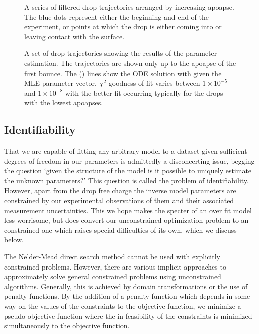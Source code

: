 \documentclass[12pt,a4paper,oneside]{book}
\begin{document}
\begin{figure}[h]
    \centering
    \resizebox{\textwidth}{!}{}
    \caption{A series of filtered drop trajectories arranged by increasing apoapse. The blue dots represent either the beginning and end of the experiment, or points at which the drop is either coming into or leaving contact with the surface.}
    \label{fig:trajectories}
\end{figure}
\begin{figure}[h]
    \centering
    \resizebox{\textwidth}{!}{}
    \caption{A set of drop trajectories showing the results of the parameter estimation. The trajectories are shown only up to the apoapse of the first bounce. The (\protect\redline) \hspace{0.25 mm} lines show the ODE solution with given the MLE parameter vector. $\chi^2$ goodness-of-fit varies between $1 \times 10^{-5}$ and $1 \times 10^{-8}$ with the better fit occurring typically for the drops with the lowest apoapses.}
    \label{fig:inverse_problem}
\end{figure}

\subsection{Identifiability}
That we are capable of fitting any arbitrary model to a dataset given sufficient degrees of freedom in our parameters is admittedly a disconcerting issue, begging the question `given the structure of the model is it possible to uniquely estimate the unknown parameters?' This question is called the problem of identifiability. However, apart from the drop free charge the inverse model parameters are constrained by our experimental observations of them and their associated measurement uncertainties. This we hope makes the specter of an over fit model less worrisome, but does convert our unconstrained optimization problem to an constrained one which raises special difficulties of its own, which we discuss below. 

The Nelder-Mead direct search method cannot be used with explicitly constrained problems. However, there are various implicit approaches to approximately solve general constrained problems using unconstrained algorithms. Generally, this is achieved by domain transformations or the use of penalty functions.  By the addition of a penalty function which depends in some way on the values of the constraints to the objective function, we minimize a pseudo-objective function where the in-feasibility of the constraints is minimized simultaneously to the objective function. 
\end{document}
